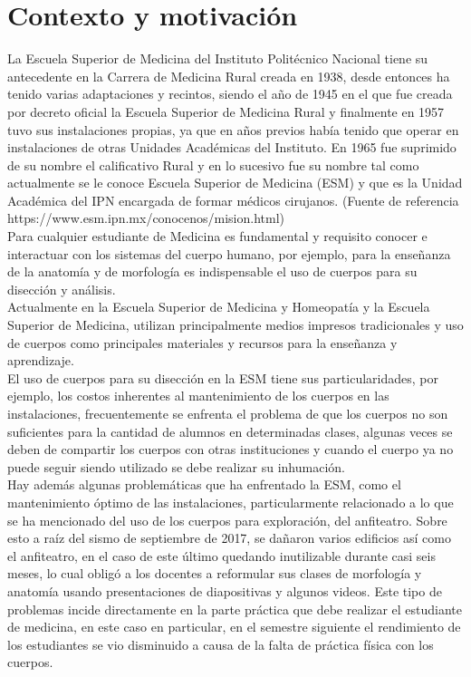 \section{Contexto y motivación}
La Escuela Superior de Medicina del Instituto Politécnico Nacional tiene su antecedente en la Carrera de Medicina Rural creada en 1938, desde entonces ha tenido varias adaptaciones y recintos, siendo el año de 1945 en el que fue creada por decreto oficial la Escuela Superior de Medicina Rural y finalmente en 1957 tuvo sus instalaciones propias, ya que en años previos había tenido que operar en instalaciones de otras Unidades Académicas del Instituto. En 1965 fue suprimido de su nombre el calificativo Rural y en lo sucesivo fue su nombre tal como actualmente se le conoce Escuela Superior de Medicina (ESM) y que es la Unidad Académica del IPN encargada de formar médicos cirujanos. (Fuente de referencia https://www.esm.ipn.mx/conocenos/mision.html)\\
Para cualquier estudiante de Medicina es fundamental y requisito conocer e interactuar con los sistemas del cuerpo humano, por ejemplo,  para la enseñanza de la anatomía y de morfología es indispensable el uso de cuerpos para su disección y análisis.\\
Actualmente en la Escuela Superior de Medicina y Homeopatía y la Escuela Superior de Medicina, utilizan principalmente medios impresos tradicionales y uso de cuerpos como principales materiales y recursos para  la enseñanza y aprendizaje.\\
El uso de cuerpos para su disección en la ESM tiene sus particularidades, por ejemplo, los costos inherentes al mantenimiento de los cuerpos en las instalaciones, frecuentemente se enfrenta el problema de que los cuerpos no son suficientes para la cantidad de alumnos en determinadas clases, algunas veces se deben de compartir los cuerpos con otras instituciones y cuando el cuerpo ya no puede seguir siendo utilizado se debe realizar su inhumación.\\
Hay además algunas problemáticas que ha enfrentado la ESM, como el mantenimiento óptimo de las instalaciones, particularmente relacionado a lo que se ha mencionado del uso de los cuerpos para exploración, del anfiteatro. Sobre esto a raíz del sismo de septiembre de 2017, se dañaron varios edificios así como el anfiteatro, en el caso de este último quedando inutilizable durante casi seis meses, lo cual obligó  a los docentes a reformular sus clases de morfología y anatomía usando presentaciones de diapositivas y algunos videos. Este tipo de problemas incide directamente en la parte práctica que debe realizar el estudiante de medicina, en este caso en particular, en el semestre siguiente el rendimiento de los estudiantes se vio disminuido a causa de la falta de práctica física con los cuerpos.\\
